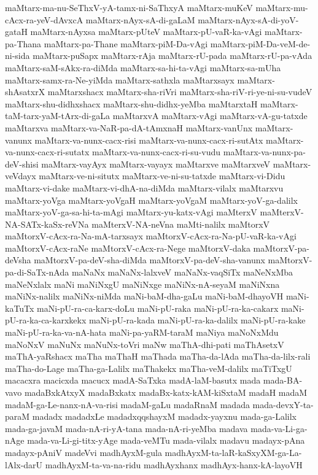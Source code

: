 {maMtarx-ma-nu-SeThxV-yA-tamx-ni-SaThxyA
maMtarx-muKeV
maMtarx-mu-cAcx-ra-yeV-dAvxcA
maMtarx-nAyx-sA-di-gaLaM
maMtarx-nAyx-sA-di-yoV-gataH
maMtarx-nAyxsa
maMtarx-pUteV
maMtarx-pU-vaR-ka-vAgi
maMtarx-pa-Thana
maMtarx-pa-Thane
maMtarx-piM-Da-vAgi
maMtarx-piM-Da-veM-de-ni-sida
maMtarx-puSapx
maMtarx-rAja
maMtarx-rU-pada
maMtarx-rU-pa-vAda
maMtarx-saM-sAkx-ra-diMda
maMtarx-sa-hi-ta-vAgi
maMtarx-sa-mUha
maMtarx-samx-ra-Ne-yiMda
maMtarx-sathxla
maMtarxsayx
maMtarx-shAsatxrX
maMtarxshacx
maMtarx-sha-riVri
maMtarx-sha-riV-ri-ye-ni-su-vudeV
maMtarx-shu-didhxshacx
maMtarx-shu-didhx-yeMba
maMtarxtaH
maMtarx-taM-tarx-yaM-tArx-di-gaLa
maMtarxvA
maMtarx-vAgi
maMtarx-vA-gu-tatxde
maMtarxva
maMtarx-va-NaR-pa-dA-tAmxnaH
maMtarx-vanUnx
maMtarx-vanunx
maMtarx-va-nunx-cacx-risi
maMtarx-va-nunx-cacx-ri-sutAtx
maMtarx-va-nunx-cacx-ri-sutatx
maMtarx-va-nunx-cacx-ri-su-vudu
maMtarx-va-nunx-pa-deV-shisi
maMtarx-vayAyx
maMtarx-vayayx
maMtarxve
maMtarxveV
maMtarx-veVdayx
maMtarx-ve-ni-situtx
maMtarx-ve-ni-su-tatxde
maMtarx-vi-Didu
maMtarx-vi-dake
maMtarx-vi-dhA-na-diMda
maMtarx-vilalx
maMtarxvu
maMtarx-yoVga
maMtarx-yoVgaH
maMtarx-yoVgaM
maMtarx-yoV-ga-dalilx
maMtarx-yoV-ga-sa-hi-ta-mAgi
maMtarx-yu-katx-vAgi
maMterxV
maMterxV-NA-SATx-kaSx-reVNa
maMterxV-NA-neVna
maMti-nalilx
maMtorxV
maMtorxV-cAcx-ra-Na-mA-tarxsayx
maMtorxV-cAcx-ra-Na-pU-vaR-ka-vAgi
maMtorxV-cAcx-raNe
maMtorxV-cAcx-ra-Nege
maMtorxV-daka
maMtorxV-pa-deVsha
maMtorxV-pa-deV-sha-diMda
maMtorxV-pa-deV-sha-vanunx
maMtorxV-pa-di-SaTx-nAda
maNaNx
maNaNx-lalxveV
maNaNx-vaqSiTx
maNeNxMba
maNeNxlalx
maNi
maNiNxgU
maNiNxge
maNiNx-nA-seyaM
maNiNxna
maNiNx-nalilx
maNiNx-niMda
maNi-baM-dha-gaLu
maNi-baM-dhayoVH
maNi-kaTuTx
maNi-pU-ra-ca-karx-doLu
maNi-pU-raka
maNi-pU-ra-ka-cakarx
maNi-pU-ra-ka-ca-karxkekx
maNi-pU-ra-kada
maNi-pU-ra-ka-dalilx
maNi-pU-ra-kake
maNi-pU-ra-ka-va-nA-hata
maNi-pa-yaRM-taraM
maNiya
maNoNxMdu
maNoNxV
maNuNx
maNuNx-toVri
maNw
maThA-dhi-pati
maThAsetxV
maThA-yaRshacx
maTha
maThaH
maThada
maTha-da-lAda
maTha-da-lilx-rali
maTha-do-Lage
maTha-ga-Lalilx
maThakekx
maTha-veM-dalilx
maTiTxgU
macacxra
macicxda
macucx
madA-SaTxka
madA-laM-basutx
mada
mada-BA-vavo
madaBxkAtxyX
madaBxkatx
madaBx-katx-kAM-kiSxtaM
madaH
madaM
madaM-ga-Le-nanx-nA-va-risi
madaM-gaLu
madaRnaM
madada
mada-devxY-ta-paraM
madadx
madadxLe
madadxqqshayxM
madadx-yayxnu
mada-ga-Lalilx
mada-ga-javaM
mada-nA-ri-yA-tana
mada-nA-ri-yeMba
madava
mada-va-Li-ga-nAge
mada-va-Li-gi-titx-yAge
mada-veMTu
mada-vilalx
madavu
madayx-pAna
madayx-pAniV
madeVvi
madhAyxM-gula
madhAyxM-ta-laR-kaSxyXM-ga-La-lAlx-darU
madhAyxM-ta-va-na-ridu
madhAyxhanx
madhAyx-hanx-kA-layoVH
}
